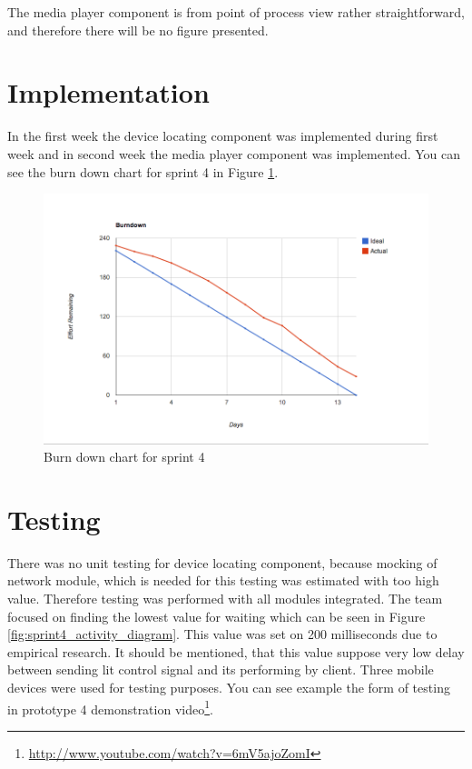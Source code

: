 The media player component is from point of process view rather straightforward, and therefore there will be no figure presented.

\section{Implementation}
In the first week the device locating component was implemented during first week and in second week the media player component was implemented.
You can see the burn down chart for sprint 4 in Figure \ref{fig:Burn4}.

\begin{figure}[h]
	\centering
		\includegraphics[width=18cm]{sprint4/BurndownSprint4.png}
	\caption{Burn down chart for sprint 4}
	\label{fig:Burn4}
\end{figure}

\section{Testing}
There was no unit testing for device locating component, because mocking of network module, which is needed for this testing was estimated with too high value.
Therefore testing was performed with all modules integrated.
The team focused on finding the lowest value for waiting which can be seen in Figure \ref{fig:sprint4_activity_diagram}.
This value was set on 200 milliseconds due to empirical research.
It should be mentioned, that this value suppose very low delay between sending lit control signal and its performing by client.
Three mobile devices were used for testing purposes.
You can see example the form of testing in prototype 4 demonstration video\footnote{\url{http://www.youtube.com/watch?v=6mV5ajoZomI}}.

